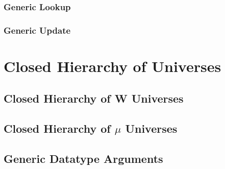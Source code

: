 \documentclass[12pt]{report}
\theoremstyle{definition}
\theoremstyle{remark}
\numberwithin{definition}{section}
\numberwithin{equation}{section}
\numberwithin{proposition}{section}
\numberwithin{conjecture}{section}
\numberwithin{theorem}{section}
\numberwithin{lemma}{section}
\numberwithin{corollary}{section}
\numberwithin{example}{section}
\numberwithin{remark}{section}
\begin{document}
\section{Generic Lookup}
\section{Generic Update}



\part{Closed Hierarchy of Universes}\label{part:hier}

\chapter{Closed Hierarchy of W Universes}\label{ch:hier}
\chapter{Closed Hierarchy of $\mu$ Universes}\label{ch:hier}
\chapter{Generic Datatype Arguments}\label{ch:gargs}



\end{document}

